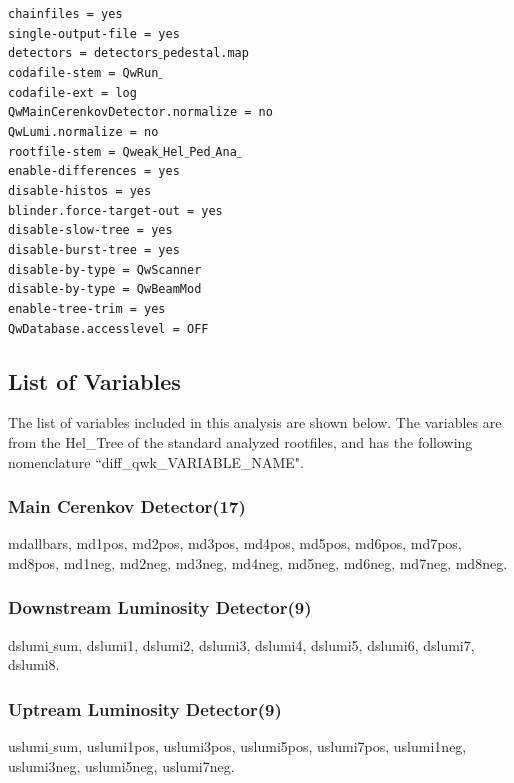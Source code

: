 \noindent
\texttt{chainfiles = yes\\
single-output-file = yes\\
detectors = detectors$\_$pedestal.map\\
codafile-stem = QwRun$\_$\\
codafile-ext = log\\
QwMainCerenkovDetector.normalize = no\\
QwLumi.normalize = no\\
rootfile-stem = Qweak$\_$Hel$\_$Ped$\_$Ana$\_$\\
enable-differences = yes\\
disable-histos = yes\\
blinder.force-target-out = yes\\
disable-slow-tree = yes\\
disable-burst-tree = yes\\
disable-by-type = QwScanner\\
disable-by-type = QwBeamMod\\
enable-tree-trim = yes\\
QwDatabase.accesslevel = OFF\\}

\subsection{List of Variables}
\label{List of Variables}
The list of variables included in this analysis are shown below. The variables are from the Hel\_Tree of the standard analyzed rootfiles, and has the following nomenclature ``diff\_qwk\_VARIABLE\_NAME".

\subsubsection{Main Cerenkov Detector(17)}
\label{Main Cerenkov Detector}
mdallbars, md1pos, md2pos, md3pos, md4pos, md5pos, md6pos, md7pos, md8pos, md1neg, md2neg, md3neg, md4neg, md5neg, md6neg, md7neg, md8neg.

\subsubsection{Downstream Luminosity Detector(9)}
\label{Downstream Luminosity Detector}
dslumi$\_$sum, dslumi1, dslumi2, dslumi3, dslumi4, dslumi5, dslumi6, dslumi7, dslumi8.

\subsubsection{Uptream Luminosity Detector(9)}
\label{Upstream Luminosity Detector}
uslumi$\_$sum, uslumi1pos, uslumi3pos, uslumi5pos, uslumi7pos, uslumi1neg, uslumi3neg, uslumi5neg, uslumi7neg.

